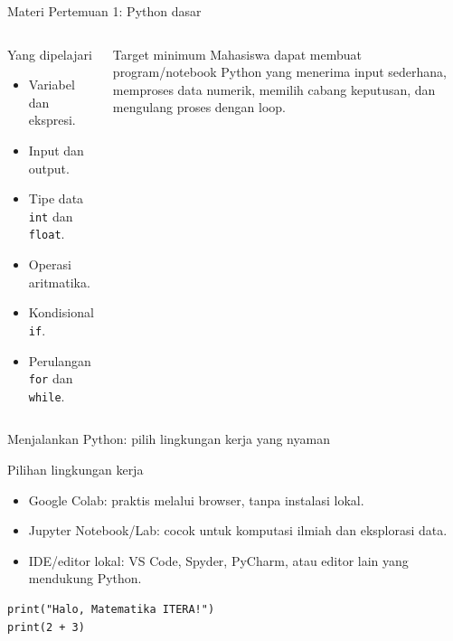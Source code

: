\documentclass[aspectratio=169,11pt]{beamer}
\begin{document}
\begin{frame}{Materi Pertemuan 1: Python dasar}
\begin{columns}[T]
\begin{block}{Yang dipelajari}
\begin{itemize}
  \item Variabel dan ekspresi.
  \item Input dan output.
  \item Tipe data \texttt{int} dan \texttt{float}.
  \item Operasi aritmatika.
  \item Kondisional \texttt{if}.
  \item Perulangan \texttt{for} dan \texttt{while}.
\end{itemize}
\end{block}
\begin{block}{Target minimum}
Mahasiswa dapat membuat program/notebook Python yang menerima input sederhana, memproses data numerik, memilih cabang keputusan, dan mengulang proses dengan loop.
\end{block}
\end{columns}
\end{frame}

\begin{frame}[fragile]{Menjalankan Python: pilih lingkungan kerja yang nyaman}
\begin{block}{Pilihan lingkungan kerja}
\begin{itemize}
  \item Google Colab: praktis melalui browser, tanpa instalasi lokal.
  \item Jupyter Notebook/Lab: cocok untuk komputasi ilmiah dan eksplorasi data.
  \item IDE/editor lokal: VS Code, Spyder, PyCharm, atau editor lain yang mendukung Python.
\end{itemize}
\end{block}
\begin{lstlisting}[style=py]
print("Halo, Matematika ITERA!")
print(2 + 3)
\end{lstlisting}
\end{frame}
\end{document}
